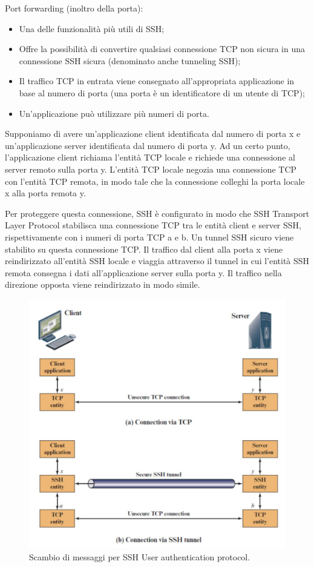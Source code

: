 Port forwarding (inoltro della porta):
\begin{itemize}
    \item Una delle funzionalità più utili di SSH;
	\item Offre la possibilità di convertire qualsiasi connessione TCP non sicura in una connessione SSH sicura (denominato anche tunneling SSH);
	\item Il traffico TCP in entrata viene consegnato all'appropriata applicazione in base al numero di porta (una porta è un identificatore di un utente di TCP);
	\item Un'applicazione può utilizzare più numeri di porta.
\end{itemize}

Supponiamo di avere un'applicazione client identificata dal numero di porta x e un'applicazione server identificata dal numero di porta y. Ad un certo punto, l'applicazione client richiama l'entità TCP locale e richiede una connessione al server remoto sulla porta y. L'entità TCP locale negozia una connessione TCP con l'entità TCP remota, in modo tale che la connessione colleghi la porta locale x alla porta remota y.

Per proteggere questa connessione, SSH è configurato in modo che SSH Transport Layer Protocol stabilisca una connessione TCP tra le entità client e server SSH, rispettivamente con i numeri di porta TCP a e b. Un tunnel SSH sicuro viene stabilito su questa connessione TCP. Il traffico dal client alla porta x viene reindirizzato all'entità SSH locale e viaggia attraverso il tunnel in cui l'entità SSH remota consegna i dati all'applicazione server sulla porta y. Il traffico nella direzione opposta viene reindirizzato in modo simile.

\begin{figure}
    \centering
    \includegraphics[width=1\textwidth]{images/chapter5/5-6.png}
    \caption{Scambio di messaggi per SSH User authentication protocol.}
    \label{fig:5-6}
\end{figure}

